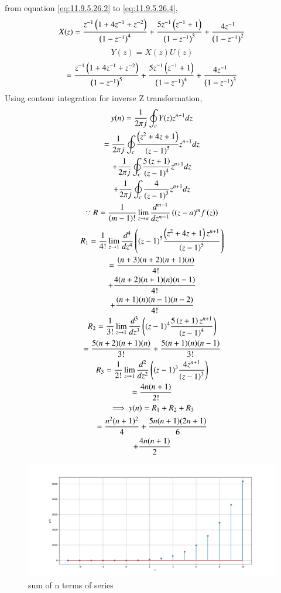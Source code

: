 \documentclass[journal,12pt,twocolumn]{IEEEtran}
\theoremstyle{remark}
\begin{document}
from equation \eqref{eq:11.9.5.26.2} to \eqref{eq:11.9.5.26.4},\\
    \begin{multline}
        X(z) = \frac{z^{-1}\left(1+4z^{-1}+z^{-2}\right)}{\left(1-z^{-1}\right)^4} + \frac{5z^{-1}\left(z^{-1}+1\right)}{\left(1-z^{-1}\right)^3} + \frac{4z^{-1}}{\left(1-z^{-1}\right)^2} 
    \end{multline}
    \begin{equation}
         Y(z) = X(z)U(z)
    \end{equation}
    \begin{multline}
        = \frac{z^{-1}\left(1+4z^{-1}+z^{-2}\right)}{\left(1-z^{-1}\right)^5} + \frac{5z^{-1}\left(z^{-1}+1\right)}{\left(1-z^{-1}\right)^4} + \frac{4z^{-1}}{\left(1-z^{-1}\right)^3} 
    \end{multline}
Using contour integration for inverse Z transformation,
    \begin{multline}
        y(n) = \frac{1}{2\pi j}\oint_c Y(z) z^{n-1} dz\\
        = \frac{1}{2\pi j}\oint_c \frac{\left(z^2+4z+1\right)}{\left(z-1\right)^5} z^{n+1} dz  \\
        + \frac{1}{2\pi j}\oint_c \frac{5\left(z+1\right)}{\left(z-1\right)^4} z^{n+1} dz \\
        + \frac{1}{2\pi j}\oint_c \frac{4}{\left(z-1\right)^3} z^{n+1} dz \\
        \because R =\frac{1}{\left(m-1\right)!}\lim\limits_{z\to a}\frac{d^{m-1}}{dz^{m-1}}\left({(z-a)}^{m}f\left(z\right)\right)
    \end{multline}
    \begin{multline}
        R_1 =\frac{1}{4!}\lim\limits_{z\to 1}\frac{d^4}{dz^4}\left((z-1)^5 \frac{\left(z^2+4z+1\right)z^{n+1}}{\left(z-1\right)^5}\right)\\
        = \frac{(n+3)(n+2)(n+1)(n)}{4!} \\
         + \frac{4(n+2)(n+1)(n)(n-1)}{4!} \\
         + \frac{(n+1)(n)(n-1)(n-2)}{4!}\\
        R_2 =\frac{1}{3!}\lim\limits_{z\to 1}\frac{d^3}{dz^3} \left((z-1)^4 \frac{5\left(z+1\right)z^{n+1}}{\left(z-1\right)^4}\right)\\
        = \frac{5(n+2)(n+1)(n)}{3!} + \frac{5(n+1)(n)(n-1)}{3!}\\
        R_3 =\frac{1}{2!}\lim\limits_{z\to 1}\frac{d^2}{dz^2} \left((z-1)^3 \frac{4z^{n+1}}{\left(z-1\right)^3}\right)\\
        = \frac{4n(n+1)}{2!}\\
        \implies y(n) = R_1 + R_2 + R_3 \\
        = \frac{n^2(n+1)^2}{4} + \frac{5n(n+1)(2n+1)}{6} \\
        + \frac{4n(n+1)}{2}
    \end{multline}

    \begin{figure}[!h] 
    \centering
    \includegraphics[width=\columnwidth]{figs/sumplot.png}
    \caption{sum of n terms of series}
    \label{fig:Graph1_math.11.9.4.8}
    \end{figure}
\end{document}
